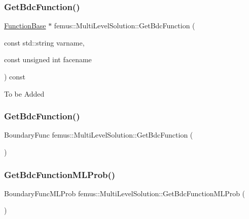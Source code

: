 \subsubsection{\texorpdfstring{Get\+Bdc\+Function()}{GetBdcFunction()}\hspace{0.1cm}{\footnotesize\ttfamily [1/2]}}
{\footnotesize\ttfamily \mbox{\hyperlink{classfemus_1_1_function_base}{Function\+Base}} $\ast$ femus\+::\+Multi\+Level\+Solution\+::\+Get\+Bdc\+Function (\begin{DoxyParamCaption}\item[{const std\+::string}]{varname,  }\item[{const unsigned int}]{facename }\end{DoxyParamCaption}) const\hspace{0.3cm}{\ttfamily [inline]}}

To be Added \mbox{\label{classfemus_1_1_multi_level_solution_a608732141319d880851214a93c874d25}} 
\subsubsection{\texorpdfstring{Get\+Bdc\+Function()}{GetBdcFunction()}\hspace{0.1cm}{\footnotesize\ttfamily [2/2]}}
{\footnotesize\ttfamily Boundary\+Func femus\+::\+Multi\+Level\+Solution\+::\+Get\+Bdc\+Function (\begin{DoxyParamCaption}{ }\end{DoxyParamCaption})\hspace{0.3cm}{\ttfamily [inline]}}

\mbox{\label{classfemus_1_1_multi_level_solution_a529322b37ffbddcf71a3e4ddea60950d}} 
\subsubsection{\texorpdfstring{Get\+Bdc\+Function\+M\+L\+Prob()}{GetBdcFunctionMLProb()}}
{\footnotesize\ttfamily Boundary\+Func\+M\+L\+Prob femus\+::\+Multi\+Level\+Solution\+::\+Get\+Bdc\+Function\+M\+L\+Prob (\begin{DoxyParamCaption}{ }\end{DoxyParamCaption})\hspace{0.3cm}{\ttfamily [inline]}}

